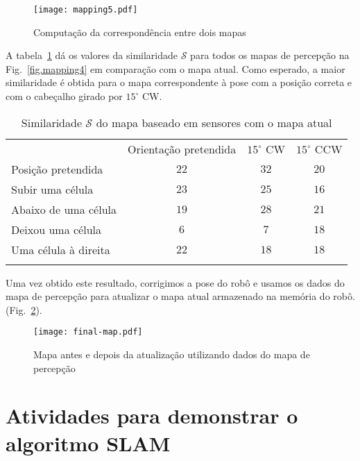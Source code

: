 \begin{figure}
\begin{center}
\texttt{[image: mapping5.pdf]}
\end{center}
\caption{Computação da correspondência entre dois mapas}\label{fig.mapping5}
\end{figure}

A tabela~\ref{tab.matching} dá os valores da similaridade $\mathcal{S}$ para todos os mapas de percepção na Fig.~\ref{fig.mapping4} em comparação com o mapa atual. Como esperado, a maior similaridade é obtida para o mapa correspondente à pose com a posição correta e com o cabeçalho girado por $15^\circ$ CW.

\begin{table}
\caption{Similaridade $\mathcal{S}$ do mapa baseado em sensores com o mapa atual}
\label{tab.matching}
\renewcommand{\arraystretch}{1.2}
\setlength{\tabcolsep}{8pt}
\begin{tabular}{p{22mm}ccc}
\hline\noalign{\smallskip}
&Orientação pretendida&$15^{\circ}$ CW&$15^{\circ}$ CCW\\
Posição pretendida & $22$ & \boldmath $32$ & $20$\\
Subir uma célula       & $23$ & $25$ & $16$\\
Abaixo de uma célula     & $19$ & $28$ & $21$\\
Deixou uma célula     & $6$  & $7$  & $18$\\
Uma célula à direita    & $22$ & $18$ & $18$\\
\noalign{\smallskip}\hline\noalign{\smallskip}
\end{tabular}
\end{table}

Uma vez obtido este resultado, corrigimos a pose do robô e usamos os dados do mapa de percepção para atualizar o mapa atual armazenado na memória do robô. (Fig.~\ref{fig.final-map}).

\begin{figure}
\begin{center}
\texttt{[image: final-map.pdf]}
\end{center}
\caption{Mapa antes e depois da atualização utilizando dados do mapa de percepção}\label{fig.final-map}
\end{figure}
\medskip

\section{Atividades para demonstrar o algoritmo SLAM}\label{s.slam-activities}

